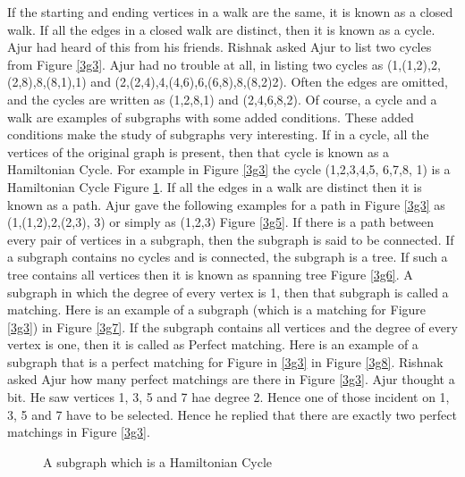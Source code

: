 If the starting and ending vertices in a walk are the same, it is known as a closed walk. If all the edges in a closed walk are distinct, then it is known as a cycle. Ajur had heard of this from his friends.
Rishnak asked Ajur to list two cycles from Figure \ref{3g3}. Ajur had no trouble at all, in listing two cycles as (1,(1,2),2,(2,8),8,(8,1),1) and (2,(2,4),4,(4,6),6,(6,8),8,(8,2)2). Often the edges are omitted, and the cycles are written as (1,2,8,1) and (2,4,6,8,2).  Of course, a cycle and a walk are examples of subgraphs with some added conditions. These added conditions make the study of subgraphs very interesting. If in a cycle, all the vertices of the original graph is present, then that cycle is known as a Hamiltonian Cycle. For example in Figure \ref{3g3} the cycle (1,2,3,4,5, 6,7,8, 1) is a Hamiltonian Cycle Figure \ref{3g4}. If all the edges in a walk are distinct then it is known as a path. Ajur gave the following examples for a path in Figure \ref{3g3} as (1,(1,2),2,(2,3), 3) or simply as (1,2,3) Figure \ref{3g5}. If there is a path between every pair of vertices in a subgraph, then the subgraph is said to be connected. If a subgraph contains no cycles and is connected, the subgraph is a tree. If such a tree contains all vertices then it is known as spanning tree Figure \ref{3g6}.  A subgraph in which the degree of every vertex is 1, then that subgraph is called a matching. Here is an example of a subgraph (which is a matching for Figure \ref{3g3}) in Figure \ref{3g7}. If the subgraph contains all vertices and the degree of every vertex is one, then it is called as Perfect matching. Here is an example of a subgraph that is a perfect matching for Figure in \ref{3g3} in Figure \ref{3g8}. Rishnak asked Ajur how many perfect matchings are there in Figure \ref{3g3}. Ajur thought a bit. He saw vertices 1, 3, 5 and 7 hae degree 2. Hence one of those incident on 1, 3, 5 and 7 have to be selected. Hence he replied that there are exactly two perfect matchings in Figure \ref{3g3}. 
\\
\begin{figure}
\begin{center}
\caption{ A subgraph which is a Hamiltonian Cycle}\label{3g4}
\end{center}
\end{figure}

